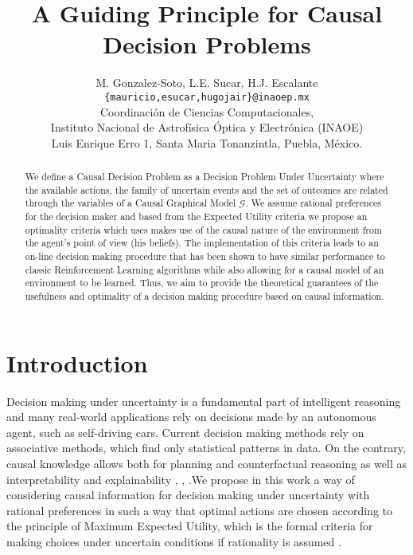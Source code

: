 \documentclass[letterpaper]{article} %
\title{A Guiding Principle for Causal Decision Problems}
\author{M. Gonzalez-Soto, L.E. Sucar, H.J. Escalante\\
\texttt{\{mauricio,esucar,hugojair\}@inaoep.mx}\\
Coordinaci\'on de Ciencias Computacionales,\\
Instituto Nacional de Astrof\'isica \'Optica y Electr\'onica (INAOE)\\
Luis Enrique Erro 1, Santa Maria Tonanzintla, Puebla, M\'exico.
}
\theoremstyle{plain}
\begin{document}
\maketitle
\begin{abstract}
We define a Causal Decision Problem as a Decision Problem Under Uncertainty where the available actions, the family of uncertain events and the set of outcomes are related through the variables of a Causal Graphical Model $\mathcal{G}$. We assume rational preferences for the decision maker and based from the Expected Utility criteria we propose an optimality criteria which uses makes use of the causal nature of the environment from the agent's point of view (his beliefs). The implementation of this criteria leads to an on-line decision making procedure that has been shown to have similar performance to classic Reinforcement Learning algorithms while also allowing for a causal model of an environment to be learned. Thus, we aim to provide the theoretical guarantees of the usefulness and optimality of a decision making procedure based on causal information.
\end{abstract}

\section{Introduction}
Decision making under uncertainty is a fundamental part of intelligent reasoning \cite{lake2017building} and many real-world applications rely on decisions made by an autonomous agent, such as self-driving cars. Current decision making methods rely on associative methods, which find only statistical patterns in data. On the contrary, causal knowledge allows both for planning and counterfactual reasoning as well as interpretability and explainability \cite{spirtes2000causation}, \cite{woodward2005making}, \cite{pearl2018why}.We propose in this work a way of considering causal information for decision making under uncertainty with rational preferences in such a way that optimal actions are chosen according to the principle of Maximum Expected Utility, which is the formal criteria for making choices under uncertain conditions if rationality is assumed \cite{bernardo2000bayesian}.
\end{document}
